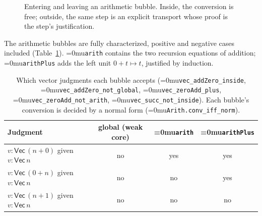 \documentclass[11pt]{article}
\newcommand{\leanname}[1]{\textup{\Urlmuskip=0mu\relax\nolinkurl{#1}}}
\theoremstyle{definition}
\theoremstyle{remark}
\begin{document}
\begin{figure}[ht]
\centering
{}
\caption{Entering and leaving an arithmetic bubble. Inside, the conversion is
free; outside, the same step is an explicit transport whose proof is the step's
justification.}
\label{fig:bubble-crossing}
\end{figure}

The arithmetic bubbles are fully characterized, positive and negative cases
included (Table~\ref{tab:vec-bubbles}). \leanname{arith} contains the two
recursion equations of addition; \leanname{arithPlus} adds the left unit
$0 + t \mapsto t$, justified by induction.

\begin{table}[ht]
\centering\small
\begin{tabular}{lccc}
\toprule
Judgment & global (weak core) & \leanname{arith} & \leanname{arithPlus}\\
\midrule
$v : \mathsf{Vec}\,(n{+}0)$ given $v : \mathsf{Vec}\,n$ & no & yes & yes\\
$v : \mathsf{Vec}\,(0{+}n)$ given $v : \mathsf{Vec}\,n$ & no & no & yes\\
$v : \mathsf{Vec}\,(n{+}1)$ given $v : \mathsf{Vec}\,n$ & no & no & no\\
\bottomrule
\end{tabular}
\caption{Which vector judgments each bubble accepts
(\leanname{vec_addZero_inside}, \leanname{vec_addZero_not_global},
\leanname{vec_zeroAdd_plus}, \leanname{vec_zeroAdd_not_arith},
\leanname{vec_succ_not_inside}). Each bubble's conversion is decided by a
normal form (\leanname{Arith.conv_iff_norm}).}
\label{tab:vec-bubbles}
\end{table}
\end{document}
